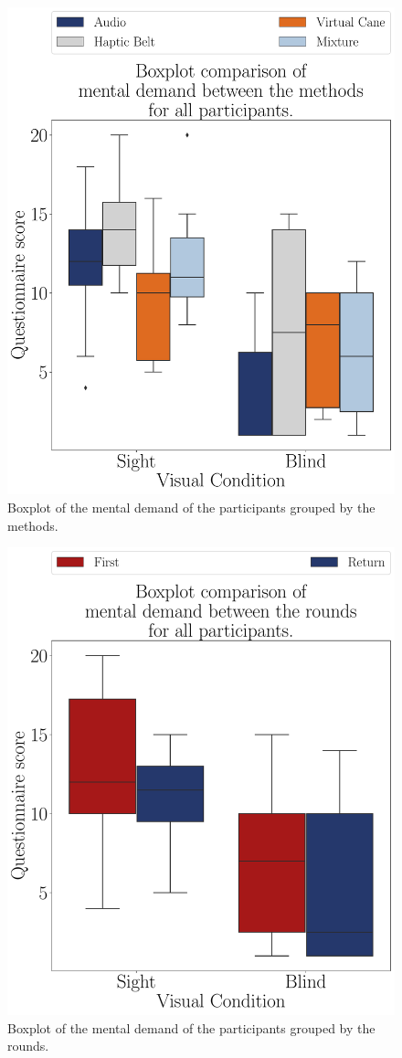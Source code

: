 \begin{figure}[!htb]
    \centering
    \includegraphics[width = 0.75\linewidth]{3 - Resultados/Figuras/boxplot_noBase_md_4_scene.pdf}
    \caption{Boxplot of the mental demand of the participants grouped by the methods.}
    \label{fig:boxplot_noBase_md_4_scene}
\end{figure}
\begin{figure}[!htb]
    \centering
    \includegraphics[width = 0.75\linewidth]{3 - Resultados/Figuras/boxplot_noBase_md_4_rounds.pdf}
    \caption{Boxplot of the mental demand of the participants grouped by the rounds.}
    \label{fig:boxplot_noBase_md_4_rounds}
\end{figure}

